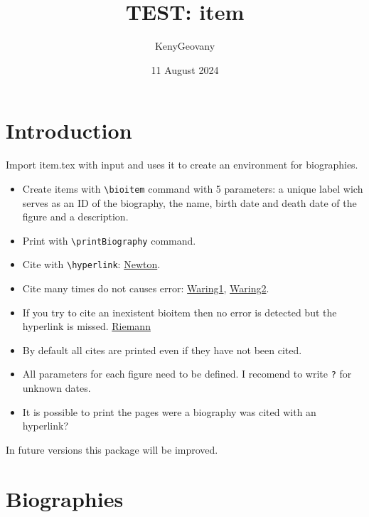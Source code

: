 \documentclass{article}
\title{TEST: item}
\author{KenyGeovany}
\date{11 August 2024}
\begin{document}
\maketitle

\section{Introduction}
Import item.tex with input and uses it to create an environment for biographies. 

\begin{itemize}
    \item Create items with \verb|\bioitem| command with 5 parameters: a unique label wich serves as an ID of the biography, the name, birth date and death date of the figure and a description.
    \item Print with \verb|\printBiography| command.
    \item Cite with \verb|\hyperlink|: \hyperlink{bioNewton}{Newton}.
    \item Cite many times do not causes error: \hyperlink{bioWaring}{Waring1}, \hyperlink{bioWaring}{Waring2}.
    \item If you try to cite an inexistent bioitem then no error is detected but the hyperlink is missed.
    \hyperlink{bioRiemann}{Riemann}
    \item By default all cites are printed even if they have not been cited.
    \item All parameters for each figure need to be defined. I recomend to write \verb|?| for unknown dates.
    \item It is possible to print the pages were a biography was cited with an hyperlink?
\end{itemize}

In future versions this package will be improved.

\section{Biographies}

\printBiography
\end{document}
